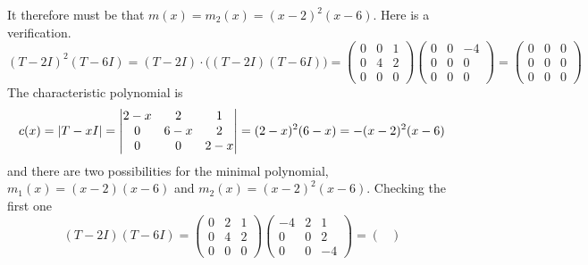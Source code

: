 \begin{exercises}
\begin{answer}
\begin{exparts}
         It therefore must be that $m(x)=m_2(x)=(x-2)^2(x-6)$. 
         Here is a verification.
         \begin{equation*}
           (T-2I)^2(T-6I)=(T-2I)\cdot\bigl((T-2I)(T-6I)\bigr)=
           \begin{pmatrix}
             0  &0  &1  \\
             0  &4  &2  \\
             0  &0  &0  
           \end{pmatrix}
           \begin{pmatrix}
              0  &0  &-4   \\
              0  &0  &0   \\
              0  &0  &0
           \end{pmatrix}
           =
           \begin{pmatrix}
             0  &0  &0  \\
             0  &0  &0   \\
             0  &0  &0
           \end{pmatrix}
         \end{equation*}
       \partsitem The characteristic polynomial is 
         \begin{equation*}
           c(x)=\deter{T-xI}=
           \begin{vmatrix}
             2-x  &2   &1     \\
             0    &6-x &2     \\
             0    &0   &2-x
           \end{vmatrix}
           =(2-x)^2(6-x)=-(x-2)^2(x-6)
         \end{equation*}
         and there are two possibilities for the minimal polynomial,
         $m_1(x)=(x-2)(x-6)$ and $m_2(x)=(x-2)^2(x-6)$.
         Checking the first one
         \begin{equation*}
           (T-2I)(T-6I)=
           \begin{pmatrix}
             0  &2  &1  \\
             0  &4  &2  \\
             0  &0  &0  
           \end{pmatrix}
           \begin{pmatrix}
             -4  &2  &1  \\
              0  &0  &2  \\
              0  &0  &-4
           \end{pmatrix}
           =
           \begin{pmatrix}

\end{pmatrix}
\end{equation*}
\end{exparts}
\end{answer}
\end{exercises}
